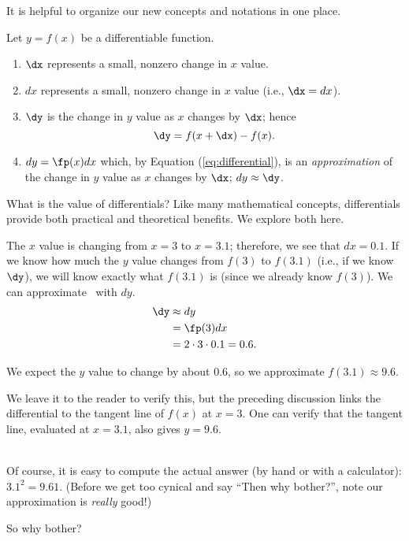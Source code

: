It is helpful to organize our new concepts and notations in one place.

{Let $y = f(x)$ be a differentiable function. 
\begin{enumerate}
	\item $\dx$ represents a small, nonzero change in $x$ value.
	\item	$dx$ represents a small, nonzero change in $x$ value (i.e., $\dx = dx$).
	\item	$\dy$ is the change in $y$ value as $x$ changes by $\dx$; hence 
	\[
	\dy = f(x+\dx)-f(x).
	\]
	\item		$dy = \fp(x)dx$ which, by Equation (\ref{eq:differential}), is an \textit{approximation} of the change in $y$ value as $x$ changes by $\dx$; $dy \approx \dy$.
\end{enumerate}
}

What is the value of differentials? Like many mathematical concepts, differentials provide both practical and theoretical benefits. We explore both here.\\

{The $x$ value is changing from $x=3$ to $x=3.1$; therefore, we see that $dx=0.1$. If we know how much the $y$ value changes from $f(3)$ to $f(3.1)$ (i.e., if we know $\dy$), we will know exactly what $f(3.1)$ is (since we already know $f(3)$). We can approximate \dy\ with $dy$.
\begin{align*} \dy &\approx dy \\
								  &= \fp(3)dx \\
								  &= 2\cdot 3\cdot 0.1 = 0.6.
\end{align*}

We expect the $y$ value to change by about $0.6$, so we approximate $f(3.1) \approx 9.6.$

We leave it to the reader to verify this, but the preceding discussion links the differential to the tangent line of $f(x)$ at $x=3$. One can verify that the tangent line, evaluated at $x=3.1$, also gives $y=9.6$.
}\\

Of course, it is easy to compute the actual answer (by hand or with a calculator): $3.1^2 = 9.61.$ (Before we get too cynical and say ``Then why bother?'', note our approximation is \textit{really} good!)

So why bother?

